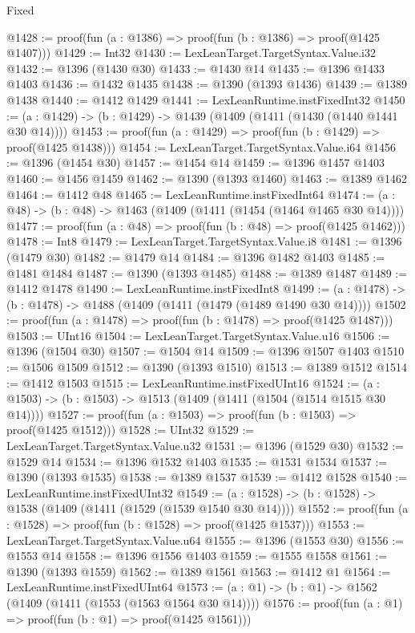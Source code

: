 \begin{lexlean}{Fixed}
\begin{coremodule}
@1428 := proof(fun (a : @1386) => proof(fun (b : @1386) => proof(@1425 @1407)))
@1429 := Int32
@1430 := LexLeanTarget.TargetSyntax.Value.i32
@1432 := @1396 (@1430 @30)
@1433 := @1430 @14
@1435 := @1396 @1433 @1403
@1436 := @1432 @1435
@1438 := @1390 (@1393 @1436)
@1439 := @1389 @1438
@1440 := @1412 @1429
@1441 := LexLeanRuntime.instFixedInt32
@1450 := (a : @1429) -> (b : @1429) -> @1439 (@1409 (@1411 (@1430 (@1440 @1441 @30 @14))))
@1453 := proof(fun (a : @1429) => proof(fun (b : @1429) => proof(@1425 @1438)))
@1454 := LexLeanTarget.TargetSyntax.Value.i64
@1456 := @1396 (@1454 @30)
@1457 := @1454 @14
@1459 := @1396 @1457 @1403
@1460 := @1456 @1459
@1462 := @1390 (@1393 @1460)
@1463 := @1389 @1462
@1464 := @1412 @48
@1465 := LexLeanRuntime.instFixedInt64
@1474 := (a : @48) -> (b : @48) -> @1463 (@1409 (@1411 (@1454 (@1464 @1465 @30 @14))))
@1477 := proof(fun (a : @48) => proof(fun (b : @48) => proof(@1425 @1462)))
@1478 := Int8
@1479 := LexLeanTarget.TargetSyntax.Value.i8
@1481 := @1396 (@1479 @30)
@1482 := @1479 @14
@1484 := @1396 @1482 @1403
@1485 := @1481 @1484
@1487 := @1390 (@1393 @1485)
@1488 := @1389 @1487
@1489 := @1412 @1478
@1490 := LexLeanRuntime.instFixedInt8
@1499 := (a : @1478) -> (b : @1478) -> @1488 (@1409 (@1411 (@1479 (@1489 @1490 @30 @14))))
@1502 := proof(fun (a : @1478) => proof(fun (b : @1478) => proof(@1425 @1487)))
@1503 := UInt16
@1504 := LexLeanTarget.TargetSyntax.Value.u16
@1506 := @1396 (@1504 @30)
@1507 := @1504 @14
@1509 := @1396 @1507 @1403
@1510 := @1506 @1509
@1512 := @1390 (@1393 @1510)
@1513 := @1389 @1512
@1514 := @1412 @1503
@1515 := LexLeanRuntime.instFixedUInt16
@1524 := (a : @1503) -> (b : @1503) -> @1513 (@1409 (@1411 (@1504 (@1514 @1515 @30 @14))))
@1527 := proof(fun (a : @1503) => proof(fun (b : @1503) => proof(@1425 @1512)))
@1528 := UInt32
@1529 := LexLeanTarget.TargetSyntax.Value.u32
@1531 := @1396 (@1529 @30)
@1532 := @1529 @14
@1534 := @1396 @1532 @1403
@1535 := @1531 @1534
@1537 := @1390 (@1393 @1535)
@1538 := @1389 @1537
@1539 := @1412 @1528
@1540 := LexLeanRuntime.instFixedUInt32
@1549 := (a : @1528) -> (b : @1528) -> @1538 (@1409 (@1411 (@1529 (@1539 @1540 @30 @14))))
@1552 := proof(fun (a : @1528) => proof(fun (b : @1528) => proof(@1425 @1537)))
@1553 := LexLeanTarget.TargetSyntax.Value.u64
@1555 := @1396 (@1553 @30)
@1556 := @1553 @14
@1558 := @1396 @1556 @1403
@1559 := @1555 @1558
@1561 := @1390 (@1393 @1559)
@1562 := @1389 @1561
@1563 := @1412 @1
@1564 := LexLeanRuntime.instFixedUInt64
@1573 := (a : @1) -> (b : @1) -> @1562 (@1409 (@1411 (@1553 (@1563 @1564 @30 @14))))
@1576 := proof(fun (a : @1) => proof(fun (b : @1) => proof(@1425 @1561)))

\end{coremodule}
\end{lexlean}
